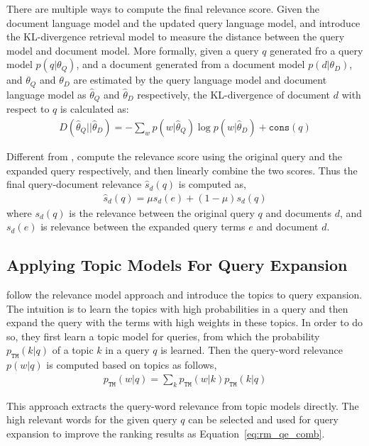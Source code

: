 There are multiple ways to compute the final relevance score. Given the document language model and the updated query language model,  \cite{Lafferty-2001} and \cite{zhai-01b} introduce the KL-divergence retrieval model to measure the distance between the query model and document model. More formally, given a query $q$ generated fro a query model $p(q|\theta_Q)$, and a document generated from a document model $p(d|\theta_D)$, and $\theta_Q$ and $\theta_D$ are estimated by the query language model and document language model as $\hat{\theta}_Q$ and $\hat{\theta}_D$ respectively, the KL-divergence of document $d$ with respect to $q$ is calculated as:
\begin{align}
D(\hat{\theta}_Q || \hat{\theta}_D) = -\sum_w p(w|\hat{\theta}_Q) \log p(w | \hat{\theta}_D) + \texttt{cons}(q)
\end{align}

Different from \cite{zhai-01b}, \cite{Lavrenko-2001} compute the relevance score using the original query and the expanded query respectively, and then linearly combine the two scores. Thus the final query-document relevance $\hat{s}_d(q)$ is computed as,
\begin{align}
\label{eq:rm_qe_comb}
\hat{s}_d(q) = \mu s_d(e) + (1-\mu)s_d(q)
\end{align}
where $s_d(q)$ is the relevance between the original query $q$ and documents $d$, and $s_d(e)$ is relevance between the expanded query terms $e$ and document $d$.

\subsection{Applying Topic Models For Query Expansion}

\cite{Yi-2009} follow the relevance model approach and introduce the topics to query expansion. The intuition is to learn the topics with high probabilities in a query and then expand the query with the terms with high weights in these topics. In order to do so, they first learn a topic model for queries, from which the probability $p_{\texttt{TM}}(k|q)$ of a topic $k$ in a query $q$ is learned. Then the query-word relevance $p(w|q)$ is computed based on topics as follows,
\begin{align}
\label{eq:query_word_prob}
p_{\texttt{TM}}(w|q) = \sum_k p_{\texttt{TM}}(w|k) p_{\texttt{TM}}(k|q)
\end{align}

This approach extracts the query-word relevance from topic models directly. The high relevant words for the given query $q$ can be selected and used for query expansion to improve the ranking results as Equation~\ref{eq:rm_qe_comb}.

